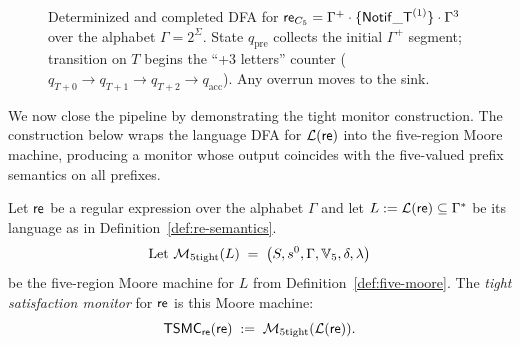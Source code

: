 \begin{example}
\begin{figure}
\begin{tikzpicture}
\end{tikzpicture}
\caption{Determinized and completed DFA for \(\mathsf{re}_{C_5}=\Gamma^{+}\cdot\{\mathsf{Notif\_T}^{(1)}\}\cdot\Gamma^{3}\) over the alphabet \(\Gamma=2^{\Sigma}\).
State \(q_{\text{pre}}\) collects the initial $\Gamma^{+}$ segment; transition on \(T\) begins
the “+3 letters” counter (\(q_{T+0}\to q_{T+1}\to q_{T+2}\to q_{\mathrm{acc}}\)).
Any overrun moves to the sink.}
\label{fig:dfa-C5-determinized}
\end{figure}
\end{example}

We now close the pipeline by demonstrating the tight monitor construction. The construction below wraps the language DFA for $\mathcal{L}\!\left(\mathsf{re}\right)$ into the five-region Moore machine, producing a monitor whose output coincides with the five-valued prefix semantics on all prefixes.

\begin{definition}\label{def:tsmc-re}
Let $\mathsf{re}$ be a regular expression over the alphabet $\Gamma$ and let
$L := \mathcal{L}\!\left(\mathsf{re}\right)\subseteq\Gamma^{*}$ be its language as in Definition~\ref{def:re-semantics}.
\[\text{Let }
  \mathcal{M}_{\text{5tight}}(L)
  \;=\;\big(S, s^0, \Gamma, \mathbb{V}_5 , \delta, \lambda\big)
\]
be the five-region Moore machine for $L$ from Definition~\ref{def:five-moore}.
The \emph{tight satisfaction monitor} for $\mathsf{re}$ is this Moore machine:
\[
  \mathsf{TSMC}_{\mathsf{re}}(\mathsf{re}) \;:=\; \mathcal{M}_{\text{5tight}}(\mathcal{L}\!\left(\mathsf{re}\right)).
\]
\end{definition}

